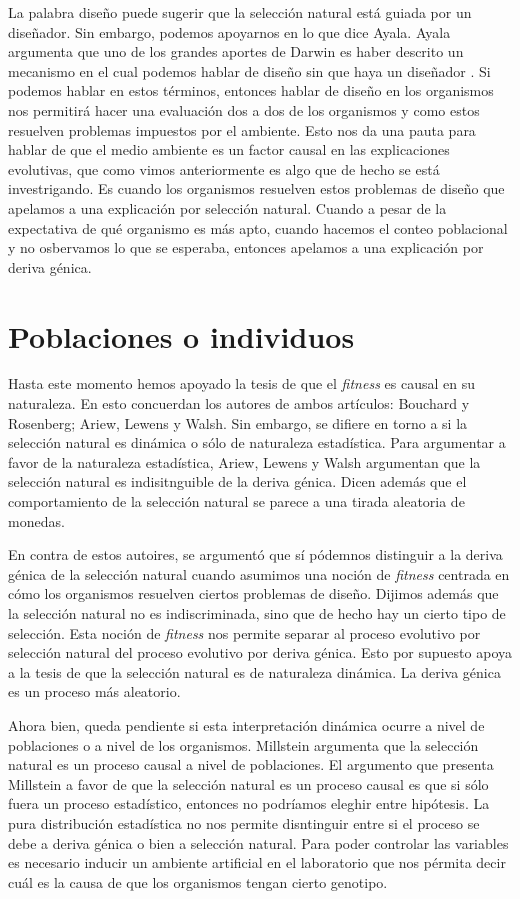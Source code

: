 La palabra diseño puede sugerir que la selección natural está guiada por un diseñador. Sin embargo, podemos apoyarnos en lo que dice Ayala. Ayala argumenta que uno de los grandes aportes de Darwin es haber descrito un mecanismo en el cual podemos hablar de diseño sin que haya un diseñador \cite{Ayala2004}. Si podemos hablar en estos términos, entonces hablar de diseño en los organismos nos permitirá hacer una evaluación dos a dos de los organismos y como estos resuelven problemas impuestos por el ambiente. Esto nos da una pauta para hablar de que el medio ambiente es un factor causal en las explicaciones evolutivas, que como vimos anteriormente es algo que de hecho se está investrigando. Es cuando los organismos resuelven estos problemas de diseño que apelamos a una explicación por selección natural. Cuando a pesar de la expectativa de qué organismo es más apto, cuando hacemos el conteo poblacional y no osbervamos lo que se esperaba, entonces apelamos a una explicación por deriva génica.

\section{Poblaciones o individuos}

Hasta este momento hemos apoyado la tesis de que el \emph{fitness} es causal en su naturaleza. En esto concuerdan los autores de ambos artículos: Bouchard y Rosenberg; Ariew, Lewens y Walsh. Sin embargo, se difiere en torno a si la selección natural es dinámica o sólo de naturaleza estadística. Para argumentar a favor de la naturaleza estadística, Ariew, Lewens y Walsh argumentan que la selección natural es indisitnguible de la deriva génica. Dicen además que el comportamiento de la selección natural se parece a una tirada aleatoria de monedas.

En contra de estos autoires, se argumentó que sí pódemnos distinguir a la deriva génica de la selección natural cuando asumimos una noción de \emph{fitness} centrada en cómo los organismos resuelven ciertos problemas de diseño. Dijimos además que la selección natural no es indiscriminada, sino que de hecho hay un cierto tipo de selección. Esta noción de \emph{fitness} nos permite separar al proceso evolutivo por selección natural del proceso evolutivo por deriva génica. Esto por supuesto apoya a la tesis de que la selección natural es de naturaleza dinámica. La deriva génica es un proceso más aleatorio.

Ahora bien, queda pendiente si esta interpretación dinámica ocurre a nivel de poblaciones o a nivel de los organismos. Millstein \citeyear{Millstein2006} argumenta que la selección natural es un proceso causal a nivel de poblaciones. El argumento que presenta Millstein a favor de que la selección natural es un proceso causal es que si sólo fuera un proceso estadístico, entonces no podríamos eleghir entre hipótesis. La pura distribución estadística no nos permite disntinguir entre si el proceso se debe a deriva génica o bien a selección natural. Para poder controlar las variables es necesario inducir un ambiente artificial en el laboratorio que nos pérmita decir cuál es la causa de que los organismos tengan cierto genotipo.

